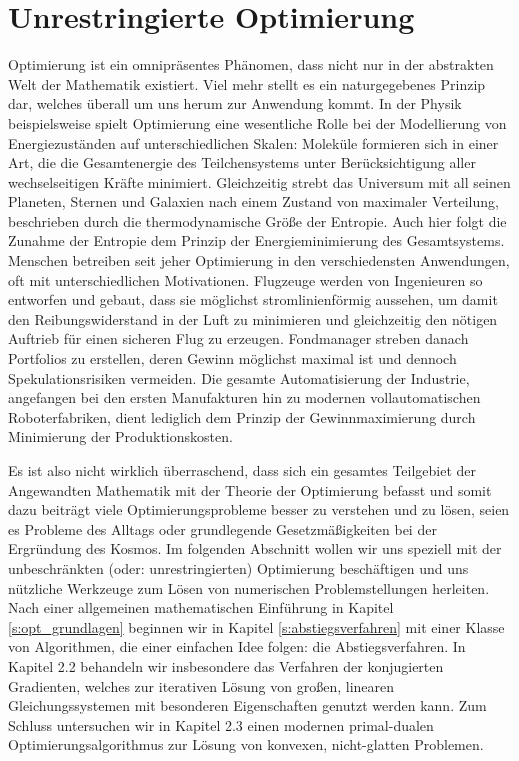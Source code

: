 \chapter{Unrestringierte Optimierung}
\label{ch:optimierung}

Optimierung ist ein omnipräsentes Phänomen, dass nicht nur in der abstrakten Welt der Mathematik existiert. Viel mehr stellt es ein naturgegebenes Prinzip dar, welches überall um uns herum zur Anwendung kommt. 
In der Physik beispielsweise spielt Optimierung eine wesentliche Rolle bei der Modellierung von Energiezuständen auf unterschiedlichen Skalen: 
Moleküle formieren sich in einer Art, die die Gesamtenergie des Teilchensystems unter Berücksichtigung aller wechselseitigen Kräfte minimiert. 
Gleichzeitig strebt das Universum mit all seinen Planeten, Sternen und Galaxien nach einem Zustand von maximaler Verteilung, beschrieben durch die thermodynamische Größe der Entropie. 
Auch hier folgt die Zunahme der Entropie dem Prinzip der Energieminimierung des Gesamtsystems.
Menschen betreiben seit jeher Optimierung in den verschiedensten Anwendungen, oft mit unterschiedlichen Motivationen. 
Flugzeuge werden von Ingenieuren so entworfen und gebaut, dass sie möglichst stromlinienförmig aussehen, um damit den Reibungswiderstand in der Luft zu minimieren und gleichzeitig den nötigen Auftrieb für einen sicheren Flug zu erzeugen. 
Fondmanager streben danach Portfolios zu erstellen, deren Gewinn möglichst maximal ist und dennoch Spekulationsrisiken vermeiden. 
Die gesamte Automatisierung der Industrie, angefangen bei den ersten Manufakturen hin zu modernen vollautomatischen Roboterfabriken, dient lediglich dem Prinzip der Gewinnmaximierung durch Minimierung der Produktionskosten.

Es ist also nicht wirklich überraschend, dass sich ein gesamtes Teilgebiet der Angewandten Mathematik mit der Theorie der Optimierung befasst und somit dazu beiträgt viele Optimierungsprobleme besser zu verstehen und zu lösen, seien es Probleme des Alltags oder grundlegende Gesetzmäßigkeiten bei der Ergründung des Kosmos. 
Im folgenden Abschnitt wollen wir uns speziell mit der unbeschränkten (oder: unrestringierten) Optimierung beschäftigen und uns nützliche Werkzeuge zum Lösen von numerischen Problemstellungen herleiten. 
Nach einer allgemeinen mathematischen Einführung in Kapitel \ref{s:opt_grundlagen} beginnen wir in Kapitel \ref{s:abstiegsverfahren} mit einer Klasse von Algorithmen, die einer einfachen Idee folgen: die Abstiegsverfahren.
In Kapitel 
2.2 
behandeln wir insbesondere das Verfahren der konjugierten Gradienten, welches zur iterativen Lösung von großen, linearen Gleichungssystemen mit besonderen Eigenschaften genutzt werden kann. 
Zum Schluss untersuchen wir in Kapitel 
2.3
einen modernen primal-dualen Optimierungsalgorithmus zur Lösung von konvexen, nicht-glatten Problemen.


